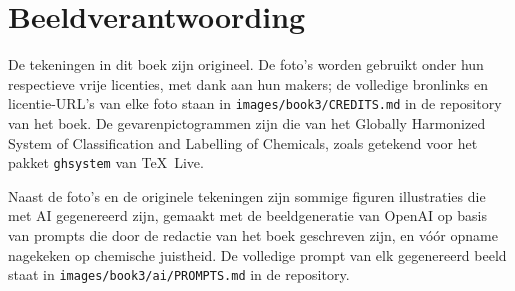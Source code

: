 \chapter*{Beeldverantwoording}

De tekeningen in dit boek zijn origineel. De foto's worden gebruikt onder
hun respectieve vrije licenties, met dank aan hun makers; de volledige
bronlinks en licentie-URL's van elke foto staan in
\texttt{images/book3/CREDITS.md} in de repository van het boek.
De gevarenpictogrammen zijn die van het Globally Harmonized System of
Classification and Labelling of Chemicals, zoals getekend voor het pakket
\texttt{ghsystem} van \TeX\ Live.

\bigskip
Naast de foto's en de originele tekeningen zijn sommige figuren
illustraties die met AI gegenereerd zijn, gemaakt met de beeldgeneratie
van OpenAI op basis van prompts die door de redactie van het boek
geschreven zijn, en vóór opname nagekeken op chemische juistheid. De
volledige prompt van elk gegenereerd beeld staat in
\texttt{images/book3/ai/PROMPTS.md} in de repository.

